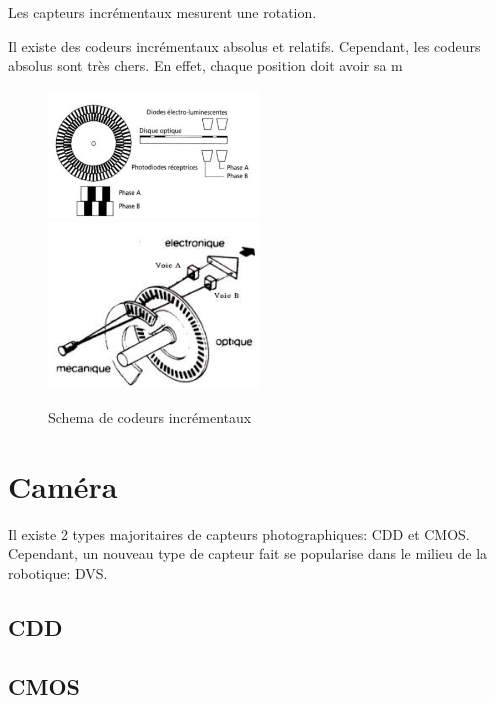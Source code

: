 \documentclass[a4paper, 11pt]{report}
\begin{document}
Les capteurs incrémentaux mesurent une rotation.

Il existe des codeurs incrémentaux absolus et relatifs. Cependant, les codeurs absolus sont très chers. En effet, chaque position doit avoir sa m

\begin{figure}[h!]
\begin{centering}
\includegraphics[width=0.5\textwidth]{images/codeurIncremental.jpg}
\includegraphics[width=0.5\textwidth]{images/schemaCodeurIncremental.jpeg}
\caption{Schema de codeurs incrémentaux}
\par\end{centering}
\end{figure}

\section{Caméra}
Il existe 2 types majoritaires de capteurs photographiques: CDD et CMOS. Cependant, un  nouveau type de capteur fait se popularise dans le milieu de la robotique: DVS.

\subsection{CDD}

\subsection{CMOS}
\end{document}
